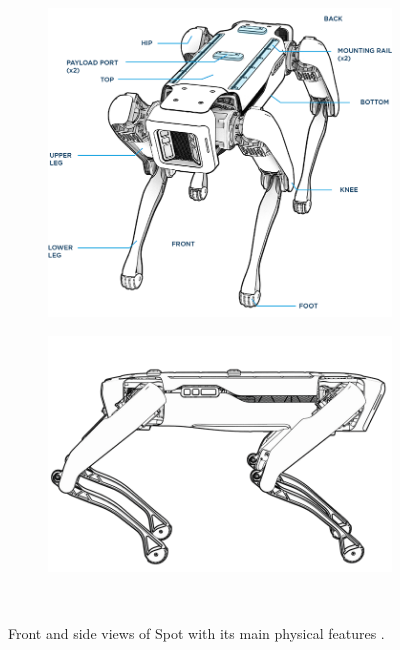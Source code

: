 \begin{figure}[ht]
    \begin{subfigure}{.48\linewidth}
    \centering
    \includegraphics{Img/00_SPOT3.png}
    \end{subfigure}
    \begin{subfigure}{0.48\linewidth}
    \centering
    \includegraphics[scale=0.3]{Img/00_SPOT1.png}
    \end{subfigure}\\
\caption{Front and side views of Spot with its main physical features \cite{Spotcharact}.}
\end{figure}

